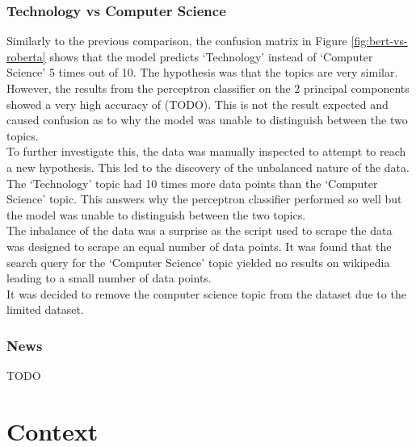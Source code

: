 \subsubsection{Technology vs Computer Science}
Similarly to the previous comparison, the confusion matrix in Figure \ref{fig:bert-vs-roberta} shows that the model predicts `Technology'
instead of `Computer Science' 5 times out of 10. The hypothesis was that the topics are very similar. However, the results from the 
perceptron classifier on the 2 principal components showed a very high accuracy of (TODO). This is not the result expected and caused
confusion as to why the model was unable to distinguish between the two topics.\\
To further investigate this, the data was manually inspected to attempt to reach a new hypothesis. This led to the discovery of the 
unbalanced nature of the data. The `Technology' topic had 10 times more data points than the `Computer Science' topic. This answers why
the perceptron classifier performed so well but the model was unable to distinguish between the two topics.\\
The inbalance of the data was a surprise as the script used to scrape the data was designed to scrape an equal number of data points.
It was found that the search query for the `Computer Science' topic yielded no results on wikipedia leading to a small number of data
points.\\
It was decided to remove the computer science topic from the dataset due to the limited dataset.
\subsubsection{News}
TODO
\section{Context}
